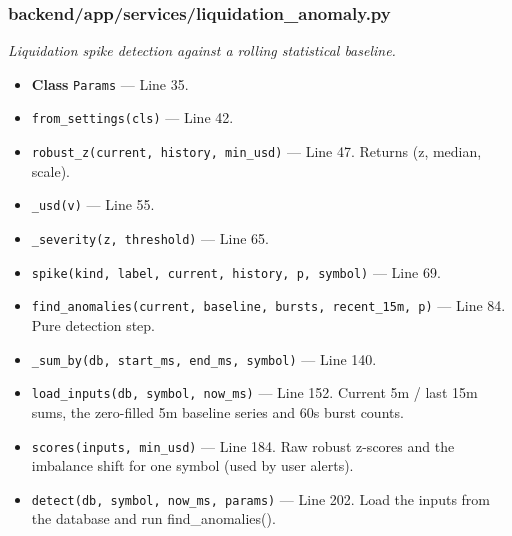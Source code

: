 \subsubsection*{backend/app/services/liquidation\_anomaly.py}
\textit{Liquidation spike detection against a rolling statistical baseline.}
\begin{itemize}[nosep,leftmargin=1.5em]
\item \textbf{Class} \texttt{Params} --- Line 35.
\item \hspace*{1em}\texttt{from\_\allowbreak{}settings(\allowbreak{}cls)} --- Line 42.
\item \texttt{robust\_\allowbreak{}z(\allowbreak{}current,\allowbreak{} history,\allowbreak{} min\_\allowbreak{}usd)} --- Line 47. Returns (z, median, scale).
\item \texttt{\_\allowbreak{}usd(\allowbreak{}v)} --- Line 55.
\item \texttt{\_\allowbreak{}severity(\allowbreak{}z,\allowbreak{} threshold)} --- Line 65.
\item \texttt{spike(\allowbreak{}kind,\allowbreak{} label,\allowbreak{} current,\allowbreak{} history,\allowbreak{} p,\allowbreak{} symbol)} --- Line 69.
\item \texttt{find\_\allowbreak{}anomalies(\allowbreak{}current,\allowbreak{} baseline,\allowbreak{} bursts,\allowbreak{} recent\_\allowbreak{}15m,\allowbreak{} p)} --- Line 84. Pure detection step.
\item \texttt{\_\allowbreak{}sum\_\allowbreak{}by(\allowbreak{}db,\allowbreak{} start\_\allowbreak{}ms,\allowbreak{} end\_\allowbreak{}ms,\allowbreak{} symbol)} --- Line 140.
\item \texttt{load\_\allowbreak{}inputs(\allowbreak{}db,\allowbreak{} symbol,\allowbreak{} now\_\allowbreak{}ms)} --- Line 152. Current 5m / last 15m sums, the zero-filled 5m baseline series and 60s burst counts.
\item \texttt{scores(\allowbreak{}inputs,\allowbreak{} min\_\allowbreak{}usd)} --- Line 184. Raw robust z-scores and the imbalance shift for one symbol (used by user alerts).
\item \texttt{detect(\allowbreak{}db,\allowbreak{} symbol,\allowbreak{} now\_\allowbreak{}ms,\allowbreak{} params)} --- Line 202. Load the inputs from the database and run find\_anomalies().
\end{itemize}
